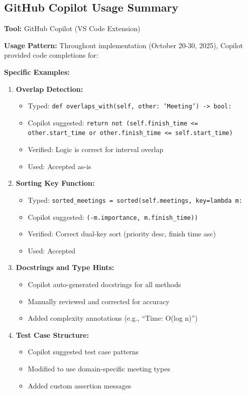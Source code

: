 \documentclass[conference]{IEEEtran}
\begin{document}
\vspace{0.4cm}

\subsection{GitHub Copilot Usage Summary}

\textbf{Tool:} GitHub Copilot (VS Code Extension)

\textbf{Usage Pattern:}
Throughout implementation (October 20-30, 2025), Copilot provided code completions for:

\textbf{Specific Examples:}
\begin{enumerate}
    \item \textbf{Overlap Detection:}
    \begin{itemize}
        \item Typed: \texttt{def overlaps\_with(self, other: 'Meeting') -> bool:}
        \item Copilot suggested: \texttt{return not (self.finish\_time <= other.start\_time or other.finish\_time <= self.start\_time)}
        \item Verified: Logic is correct for interval overlap
        \item Used: Accepted as-is
    \end{itemize}
    
    \item \textbf{Sorting Key Function:}
    \begin{itemize}
        \item Typed: \texttt{sorted\_meetings = sorted(self.meetings, key=lambda m:}
        \item Copilot suggested: \texttt{(-m.importance, m.finish\_time))}
        \item Verified: Correct dual-key sort (priority desc, finish time asc)
        \item Used: Accepted
    \end{itemize}
    
    \item \textbf{Docstrings and Type Hints:}
    \begin{itemize}
        \item Copilot auto-generated docstrings for all methods
        \item Manually reviewed and corrected for accuracy
        \item Added complexity annotations (e.g., ``Time: O(log n)'')
    \end{itemize}
    
    \item \textbf{Test Case Structure:}
    \begin{itemize}
        \item Copilot suggested test case patterns
        \item Modified to use domain-specific meeting types
        \item Added custom assertion messages
    \end{itemize}
\end{enumerate}
\end{document}
